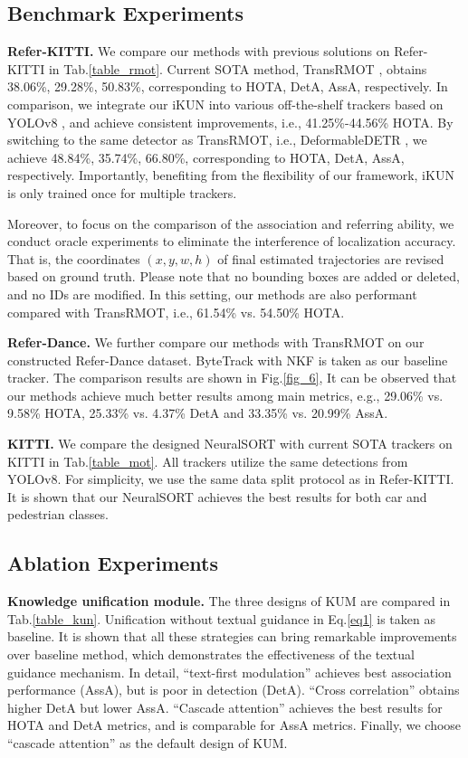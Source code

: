 \documentclass[10pt,twocolumn,letterpaper]{article}
\begin{document}
\subsection{Benchmark Experiments}
    \noindent\textbf{Refer-KITTI.}
    We compare our methods with previous solutions on Refer-KITTI in Tab.\ref{table_rmot}.
    Current SOTA method, TransRMOT \cite{wu2023referring}, obtains 38.06\%, 29.28\%, 50.83\%, corresponding to HOTA, DetA, AssA, respectively.
    In comparison, we integrate our iKUN into various off-the-shelf trackers based on YOLOv8 \cite{Jocher_YOLO_by_Ultralytics_2023},
    and achieve consistent improvements, i.e., 41.25\%-44.56\% HOTA.
    By switching to the same detector as TransRMOT, i.e., DeformableDETR \cite{zhu2020deformable}, 
    we achieve 48.84\%, 35.74\%, 66.80\%, corresponding to HOTA, DetA, AssA, respectively.
    Importantly, benefiting from the flexibility of our framework, iKUN is only trained once for multiple trackers.

    Moreover, to focus on the comparison of the association and referring ability, 
    we conduct oracle experiments to eliminate the interference of localization accuracy.
    That is, the coordinates $(x,y,w,h)$ of final estimated trajectories are revised based on ground truth.
    Please note that no bounding boxes are added or deleted, and no IDs are modified.
    In this setting, our methods are also performant compared with TransRMOT, i.e., 61.54\% vs. 54.50\% HOTA.

    \noindent\textbf{Refer-Dance.}
    We further compare our methods with TransRMOT on our constructed Refer-Dance dataset.
    ByteTrack \cite{zhang2022bytetrack} with NKF is taken as our baseline tracker.
    The comparison results are shown in Fig.\ref{fig_6}, 
    It can be observed that our methods achieve much better results among main metrics, 
    e.g., 29.06\% vs. 9.58\% HOTA, 25.33\% vs. 4.37\% DetA and 33.35\% vs. 20.99\% AssA.

    \noindent\textbf{KITTI.}
    We compare the designed NeuralSORT with current SOTA trackers on KITTI in Tab.\ref{table_mot}.
    All trackers utilize the same detections from YOLOv8.
    For simplicity, we use the same data split protocol as in Refer-KITTI.
    It is shown that our NeuralSORT achieves the best results for both car and pedestrian classes.

\subsection{Ablation Experiments}
    \noindent\textbf{Knowledge unification module.}
    The three designs of KUM are compared in Tab.\ref{table_kun}.
    Unification without textual guidance in Eq.\ref{eq1} is taken as baseline.
    It is shown that all these strategies can bring remarkable improvements over baseline method,
    which demonstrates the effectiveness of the textual guidance mechanism.
    In detail, ``text-first modulation'' achieves best association performance (AssA), but is poor in detection (DetA).
    ``Cross correlation'' obtains higher DetA but lower AssA.
    ``Cascade attention'' achieves the best results for HOTA and DetA metrics, and is comparable for AssA metrics.
    Finally, we choose ``cascade attention'' as the default design of KUM.
\end{document}

